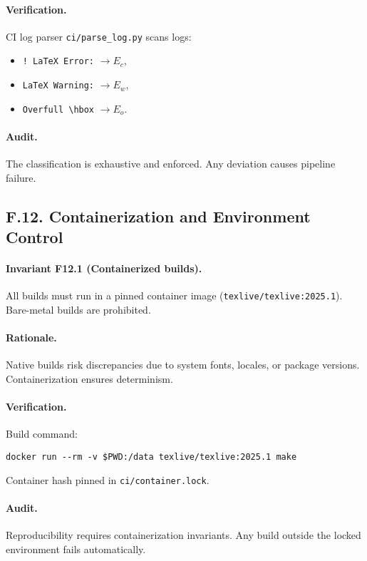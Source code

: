 \paragraph{Verification.}
CI log parser \texttt{ci/parse\_log.py} scans logs:
\begin{itemize}
  \item \texttt{! LaTeX Error:} $\to E_c$,
  \item \texttt{LaTeX Warning:} $\to E_w$,
  \item \verb|Overfull \hbox| $\to E_o$.
\end{itemize}

\paragraph{Audit.}
The classification is exhaustive and enforced. Any deviation causes
pipeline failure.

\subsection*{F.12. Containerization and Environment Control}

\paragraph{Invariant F12.1 (Containerized builds).}
All builds must run in a pinned container image
(\texttt{texlive/texlive:2025.1}). Bare-metal builds are prohibited.

\paragraph{Rationale.}
Native builds risk discrepancies due to system fonts, locales, or
package versions. Containerization ensures determinism.

\paragraph{Verification.}
Build command:
\begin{verbatim}
docker run --rm -v $PWD:/data texlive/texlive:2025.1 make
\end{verbatim}
Container hash pinned in \texttt{ci/container.lock}.

\paragraph{Audit.}
Reproducibility requires containerization invariants. Any build outside
the locked environment fails automatically.

